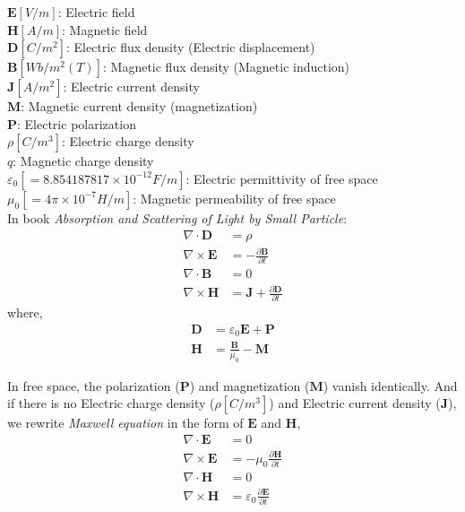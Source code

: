 $\mathbf{E} [V/m]$: Electric field \\
$\mathbf{H} [A/m]$: Magnetic field \\
$\mathbf{D} [C/m^2]$: Electric flux density (Electric displacement) \\
$\mathbf{B} [Wb/m^2(T)]$: Magnetic flux density (Magnetic induction) \\
$\mathbf{J} [A/m^2]$: Electric current density \\
$\mathbf{M}$: Magnetic current density (magnetization)\\
$\mathbf{P}$: Electric polarization \\
$\rho [C/m^3]$: Electric charge density \\
$q$: Magnetic charge density \\
$\varepsilon_0 [=8.854187817\times10^{-12}F/m]$: Electric permittivity of free space \\
$\mu_0 [=4\pi\times10^{-7}H/m]$: Magnetic permeability of free space \\

In book \textit{Absorption and Scattering of Light by Small Particle}:
\begin{align}
	\nabla\cdot\mathbf{D}  &= \rho \\
	\nabla\times\mathbf{E} &= -\frac{\partial\mathbf{B}}{\partial t} \\
	\nabla\cdot\mathbf{B}  &= 0 \\
	\nabla\times\mathbf{H} &= \mathbf{J} + \frac{\partial\mathbf{D}}{\partial t}
\end{align}
where,
\begin{align}
	\mathbf{D} &= \varepsilon_0\mathbf{E} + \mathbf{P} \\
	\mathbf{H} &= \frac{\mathbf{B}}{\mu_0} - \mathbf{M}
\end{align}

In free space, the polarization ($\mathbf{P}$) and magnetization ($\mathbf{M}$) vanish identically. And if there is no Electric charge density ($\rho [C/m^3]$) and Electric current density ($\mathbf{J}$), we rewrite \textit{Maxwell equation} in the form of $\mathbf{E}$ and $\mathbf{H}$,
\begin{align}
	\nabla\cdot\mathbf{E}  &= 0 \\
	\nabla\times\mathbf{E} &= -\mu_0\frac{\partial\mathbf{H}}{\partial t} \\
	\nabla\cdot\mathbf{H}  &= 0 \\
	\nabla\times\mathbf{H} &= \varepsilon_0\frac{\partial\mathbf{E}}{\partial t}
\end{align}

